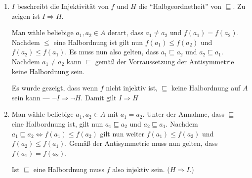 \documentclass{article}
\begin{document}


\begin{enumerate}[label=\alph*)]
    \item $I$ beschreibt die Injektivität von $f$ und $H$ die \enquote{Halbgeordnetheit} von $\sqsubseteq$. Zu zeigen ist $I \Rightarrow H$.
    
    Man wähle beliebige $a_1, a_2 \in A$ derart, dass $a_1 \neq a_2$ und $f(a_1) = f(a_2)$. Nachdem $\leq$ eine Halbordnung ist gilt nun $f(a_1) \leq f(a_2)$ und $f(a_2) \leq f(a_1)$. Es muss nun also gelten, dass $a_1 \sqsubseteq a_2$ und $a_2 \sqsubseteq a_1$. Nachdem $a_1 \neq a_2$ kann $\sqsubseteq$ gemäß der Vorraussetzung der Antisymmetrie keine Halbordnung sein.
    
    Es wurde gezeigt, dass wenn $f$ nicht injektiv ist, $\sqsubseteq$ keine Halbordnung auf $A$ sein kann --- $\neg I \Rightarrow \neg H$. Damit gilt $I \Rightarrow H$

    \item Man wähle beliebige $a_1, a_2 \in A$ mit $a_1 = a_2$. Unter der Annahme, dass $\sqsubseteq$ eine Halbordnung ist, gilt nun $a_1 \sqsubseteq a_2$ und $a_2 \sqsubseteq a_1$. Nachdem $a_1 \sqsubseteq a_2 \Leftrightarrow f(a_1) \leq f(a_2)$ gilt nun weiter  $f(a_1) \leq f(a_2)$ und $f(a_2) \leq f(a_1)$. Gemäß der Antisymmetrie muss nun gelten, dass $f(a_1) = f(a_2)$.
    
    Ist $\sqsubseteq$ eine Halbordnung muss $f$ also injektiv sein. ($H \Rightarrow I$.)
\end{enumerate}
\end{document}
